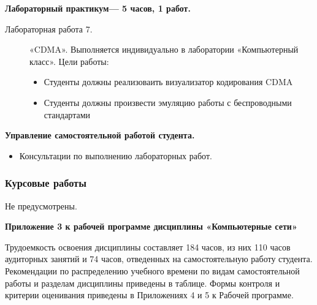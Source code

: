 \begin{center}
{\textbf{Лабораторный практикум— 5 часов, 1 работ.}
\begin{description}
\item[Лабораторная работа 7.] «CDMA». Выполняется индивидуально в лаборатории «Компьютерный класс». Цели работы: \begin{itemize}
\item Студенты должны реализоваить визуализатор кодирования CDMA\item Студенты должны произвести эмуляцию работы с беспроводными стандартами
\end{itemize}
\end{description}

\textbf{Управление самостоятельной работой студента.}
\begin{itemize}
\item Консультации по выполнению лабораторных работ.
\end{itemize}
}



\subsubsection{Курсовые работы}
{\parindent0pt
Не предусмотрены.
}

\newpage
\pagestyle{empty}
\begin{landscape}
\begin{flushright}
\textbf{Приложение 3
к рабочей программе дисциплины
«Компьютерные сети»}
\end{flushright}

Трудоемкость освоения дисциплины составляет 184 часов, из них 110 часов аудиторных занятий и 74 часов, отведенных на самостоятельную работу студента.
Рекомендации по распределению учебного времени по видам самостоятельной работы и разделам дисциплины приведены в таблице.
Формы контроля и критерии оценивания приведены в Приложениях 4 и 5 к Рабочей программе.


\end{landscape}
\end{center}
